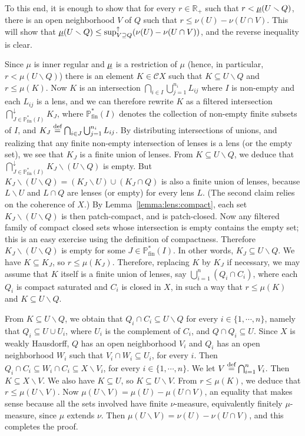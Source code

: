 \documentclass[preprint,12pt]{elsarticle}
\newcommand\eqdef{\mathrel{\buildrel \text{def}\over=}}
\newcommand\pow{\mathbb{P}}
\newcommand\Pfin{\pow_{\mathrm{fin}}}
\newcommand{\Rp}{\mathbb{R}_+}
\newcommand\diff{\smallsetminus}
\newcommand\dsup{\sup\nolimits^{\scriptstyle\uparrow}}
\newcommand\fcap{\bigcap\nolimits^{\scriptstyle\downarrow}}
\begin{document}
To this end, it is enough to show that for every $r \in \Rp$ such that
$r < \underline{\smash\mu} (U \diff Q)$, there is an open neighborhood
$V$ of $Q$ such that $r \leq \nu (U) - \nu (U \cap V)$.  This will
show that
$\underline{\smash\mu} (U \diff Q) \leq \dsup_{V \supseteq Q} (\nu (U)
- \nu (U \cap V))$, and the reverse inequality is clear.

Since $\mu$ is inner regular and $\underline{\smash\mu}$ is a restriction of $\mu$
(hence, in particular, $r < \mu (U \diff Q)$) there is an element
$K \in \mathcal C X$ such that $K \subseteq U \diff Q$ and
$r \leq \mu (K)$.  Now $K$ is an intersection
$\bigcap_{i \in I} \bigcup_{j=1}^{n_i} L_{ij}$ where $I$ is non-empty
and each $L_{ij}$ is a lens, and we can therefore rewrite $K$ as a
filtered intersection $\fcap_{J \in \Pfin^* (I)} K_J$, where
$\Pfin^* (I)$ denotes the collection of non-empty finite subsets of
$I$, and $K_J \eqdef \bigcap_{i \in J} \bigcup_{j=1}^{n_i} L_{ij}$.
By distributing intersections of unions, and realizing that any finite
non-empty intersection of lenses is a lens (or the empty set), we see
that $K_J$ is a finite union of lenses.  From $K \subseteq U \diff Q$,
we deduce that $\fcap_{J \in \Pfin^* (I)} K_J \diff (U \diff Q)$ is
empty.  But $K_J \diff (U \diff Q) = (K_J \diff U) \cup (K_J \cap Q)$
is also a finite union of lenses, because $L \diff U$ and $L \cap Q$
are lenses (or empty) for every lens $L$.  (The second claim relies on
the coherence of $X$.)  By Lemma~\ref{lemma:lens:compact}, each set
$K_J \diff (U \diff Q)$ is then patch-compact, and is patch-closed.
Now any filtered family of compact closed sets whose intersection is
empty contains the empty set; this is an easy exercise using the
definition of compactness.  Therefore $K_J \diff (U \diff Q)$ is empty
for some $J \in \Pfin^* (I)$.  In other words,
$K_J \subseteq U \diff Q$.  We have $K \subseteq K_J$, so
$r \leq \mu (K_J)$.  Therefore, replacing $K$ by $K_J$ if necessary,
we may assume that $K$ itself is a finite union of lenses, say
$\bigcup_{i=1}^n (Q_i \cap C_i)$, where each $Q_i$ is compact
saturated and $C_i$ is closed in $X$, in such a way that
$r \leq \mu (K)$ and $K \subseteq U \diff Q$.

From $K \subseteq U \diff Q$, we obtain that
$Q_i \cap C_i \subseteq U \diff Q$ for every $i \in \{1, \cdots, n\}$,
namely that $Q_i \subseteq U \cup U_i$, where $U_i$ is the complement
of $C_i$, and $Q \cap Q_i \subseteq U$.  Since $X$ is weakly
Hausdorff, $Q$ has an open neighborhood $V_i$ and $Q_i$ has an open
neighborhood $W_i$ such that $V_i \cap W_i \subseteq U_i$, for every
$i$.  Then
$Q_i \cap C_i \subseteq W_i \cap C_i \subseteq X \diff V_i$, for every
$i \in \{1, \cdots, n\}$.  We let $V \eqdef \bigcap_{i=1}^n V_i$.
Then $K \subseteq X \diff V$.  We also have $K \subseteq U$, so
$K \subseteq U \diff V$.  From $r \leq \mu (K)$, we deduce that
$r \leq \mu (U \diff V)$.  Now
$\mu (U \diff V) = \mu (U) - \mu (U \cap V)$, an equality that makes
sense because all the sets involved have finite $\nu$-measure,
equivalently finitely $\mu$-measure, since $\mu$ extends $\nu$.  Then
$\mu (U \diff V) = \nu (U) - \nu (U \cap V)$, and this completes the
proof.
\end{document}
